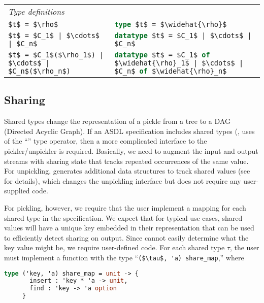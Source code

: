 \begin{table}[tp]
\begin{center}
\begin{tabular}{|l|p{3in}|}
      \hline
      \textit{Type definitions} & \\[0.25em]
      \lstinline[language=ASDL,mathescape=true]@$t$ = $\rho$@
        & \lstinline[language=SML,mathescape=true]!type $t$ = $\widehat{\rho}$! \\[0.5em]
      \lstinline[language=ASDL,mathescape=true]@$t$ = $C_1$ | $\cdots$ | $C_n$@
        & \lstinline[language=SML,mathescape=true]!datatype $t$ = $C_1$ | $\cdots$ | $C_n$! \\[0.5em]
      \lstinline[language=ASDL,mathescape=true]@$t$ = $C_1$($\rho_1$) | $\cdots$ | $C_n$($\rho_n$)@
        & \lstinline[language=SML,mathescape=true]!datatype $t$ = $C_1$ of $\widehat{\rho}_1$ | $\cdots$ | $C_n$ of $\widehat{\rho}_n$! \\[0.25em]
      \hline
    \end{tabular}%
  \end{center}%
\end{table}%

\subsection{Sharing}
Shared types change the representation of a pickle from a tree to a DAG
(Directed Acyclic Graph).
If an ASDL specification includes shared types (\ie{}, uses of the ``\kw{!}''
type operator, then a more complicated interface to the pickler/unpickler
is required.
Basically, we need to augment the input and output streams with sharing
state that tracks repeated occurrences of the same value.
For unpickling, \asdlgen{} generates additional data structures to track
shared values (see  for details), which changes
the unpickling interface but does not require any user-supplied code.

For pickling, however, we require that the user implement a mapping for
each shared type in the specification.
We expect that for typical use cases, shared values will have a unique key
embedded in their representation that can be used to efficiently detect sharing on
output.
Since \asdlgen{} cannot easily determine what the key value might be, we
require user-defined code.
For each shared type $\tau$, the user must implement a function with the
type ``\lstinline[language=sml,mathescape=true]@($\tau$, 'a) share_map@,''
where
\begin{code}
\begin{lstlisting}[language=sml]
type ('key, 'a) share_map = unit -> {
       insert : 'key * 'a -> unit,
       find : 'key -> 'a option
     }
\end{lstlisting}%
\end{code}%


